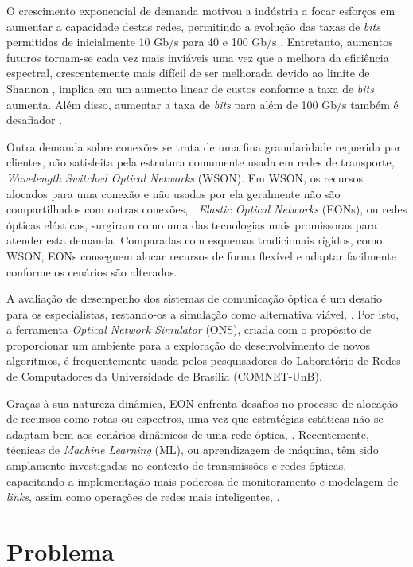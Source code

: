 O crescimento exponencial de demanda motivou a indústria a focar esforços em aumentar a capacidade destas redes, permitindo a evolução das taxas de \textit{bits} permitidas de inicialmente 10 Gb/s para 40 e 100 Gb/s \cite{vizcaino_eon_energy}. Entretanto, aumentos futuros tornam-se cada vez mais inviáveis uma vez que a melhora da eficiência espectral, crescentemente mais difícil de ser melhorada devido ao limite de Shannon \cite{jinno_eon_benefits}, implica em um aumento linear de custos conforme a taxa de \textit{bits} aumenta. Além disso, aumentar a taxa de \textit{bits} para além de 100 Gb/s também é desafiador \cite{jinno_eon_benefits}.

Outra demanda sobre conexões se trata de uma fina granularidade requerida por clientes, não satisfeita pela estrutura comumente usada em redes de transporte, \textit{Wavelength Switched Optical Networks} (WSON). Em WSON, os recursos alocados para uma conexão e não usados por ela geralmente não são compartilhados com outras conexões, \cite{dantaschallenges2014}. \textit{Elastic Optical Networks} (EONs), ou redes ópticas elásticas, surgiram como uma das tecnologias mais promissoras para atender esta demanda. Comparadas com esquemas tradicionais rígidos, como WSON, EONs conseguem alocar recursos de forma flexível e adaptar facilmente conforme os cenários são alterados. \cite{deeplearning4j}

A avaliação de desempenho dos sistemas de comunicação óptica é um desafio para os especialistas, restando-os a simulação como alternativa viável, \cite{costa2016ons}. Por isto, a ferramenta \textit{Optical Network Simulator} (ONS), criada com o propósito de proporcionar um ambiente para a exploração do desenvolvimento de novos algoritmos, é frequentemente usada pelos pesquisadores do Laboratório de Redes de Computadores da Universidade de Brasília (COMNET-UnB).

Graças à sua natureza dinâmica, EON enfrenta desafios no processo de alocação de recursos como rotas ou espectros, uma vez que estratégias estáticas não se adaptam bem aos cenários dinâmicos de uma rede óptica,  \cite{deep_quality_rsa}. Recentemente, técnicas de \textit{Machine Learning} (ML), ou aprendizagem de máquina, têm sido amplamente investigadas no contexto de transmissões e redes ópticas, capacitando a implementação mais poderosa de monitoramento e modelagem de \textit{links}, assim como operações de redes mais inteligentes, \cite{eon_ml_application}.

\section{Problema}
\label{intro-problem}

